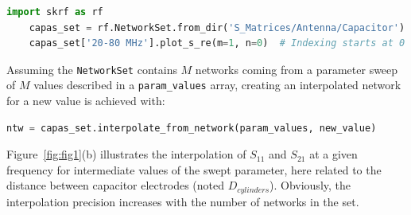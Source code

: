 \documentclass[%
aip,
cp,  %
amsmath,amssymb,%
reprint,%
]{revtex4-2}
\begin{document}
	\begin{lstlisting}[language=Python]
	import skrf as rf
	capas_set = rf.NetworkSet.from_dir('S_Matrices/Antenna/Capacitor')
	capas_set['20-80 MHz'].plot_s_re(m=1, n=0)  # Indexing starts at 0 in Python	\end{lstlisting}
	
	Assuming the \texttt{NetworkSet} contains $M$ networks coming from a parameter sweep of $M$ values described in a \texttt{param\_values} array, creating an interpolated network for a new value is achieved with:
	
	\begin{lstlisting}[language=Python]
	ntw = capas_set.interpolate_from_network(param_values, new_value)	\end{lstlisting}
	
	Figure~\ref{fig:fig1}(b) illustrates the interpolation of $S_{11}$ and $S_{21}$ at a given frequency for intermediate values of the swept parameter, here related to the distance between capacitor electrodes (noted $D_{cylinders}$). Obviously, the interpolation precision increases with the number of networks in the set.
	
\end{document}
